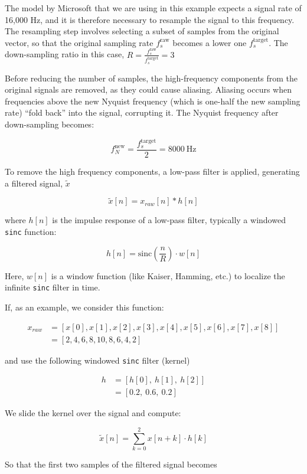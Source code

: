 \documentclass[conference]{IEEEtran}
\begin{document}
The model by Microsoft that we are using in this example expects a signal rate of 16,000 Hz, and it is therefore necessary to resample the signal to this frequency. The resampling step involves selecting a subset of samples from the original vector, so that the original sampling rate $f_s^{\text{raw}}$ becomes a lower one $f_s^{\text{target}}$. The down-sampling ratio in this case, $R = \frac{f_s^{\text{raw}}}{f_s^{\text{target}}} = 3$


Before reducing the number of samples, the high-frequency components from the original signals are removed, as they could cause aliasing. Aliasing occurs when frequencies above the new Nyquist frequency (which is one-half the new sampling rate) “fold back” into the signal, corrupting it. The Nyquist frequency after down-sampling becomes:

$$f_N^{\text{new}} = \frac{f_s^{\text{target}}}{2} = 8000~\text{Hz}$$

To remove the high frequency components, a low-pass filter is applied, generating a filtered signal, $\tilde{x}$

$$\tilde{x}[n] = x_{raw}[n] * h[n]$$

where $h[n]$ is the impulse response of a low-pass filter, typically a windowed \texttt{sinc} function:

$$h[n] = \text{sinc}\left(\frac{n}{R}\right) \cdot w[n]$$

Here, $w[n]$ is a window function (like Kaiser, Hamming, etc.) to localize the infinite \texttt{sinc} filter in time.

If, as an example, we consider this function:

\begin{align*}
	x_{raw} &=[x[0], x[1], x[2], x[3], x[4], x[5], x[6], x[7], x[8]]\\
		 	&=[2, 4, 6, 8, 10, 8, 6, 4, 2]
\end{align*}

and use the following windowed \texttt{sinc} filter (kernel)

\begin{align*}
	h &= [h[0],\ h[1],\ h[2]]\\
	  &= [0.2,\ 0.6,\ 0.2]
\end{align*}

We slide the kernel over the signal and compute:

$$\tilde{x}[n] = \sum_{k=0}^{2} x[n + k] \cdot h[k]$$

So that the first two samples of the filtered signal becomes
\end{document}
